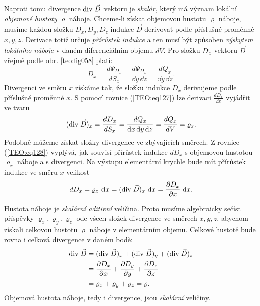       Naproti tomu divergence \(\mathrm{div}\;\vec{D}\) vektoru je \emph{skalár}, který má význam lokální 
      \emph{objemové hustoty} \(\varrho\) náboje. Chceme-li získat objemovou hustotu \(\varrho\) 
      náboje, musíme každou složku \(D_x, D_y , D_z\) indukce \(\vec{D}\) derivovat podle příslušné 
      proměnné \(x, y, z\). Derivace totiž určuje \emph{přírůstek indukce} a ten musí být způsoben 
      \emph{výskytem lokálního náboje} v daném diferenciálním objemu \(dV\). Pro složku \(D_x\) 
      vektoru \(\vec{D}\) zřejmě podle obr. \ref{teo:fig058} platí:
      \begin{equation}\label{TEO:eq127}
        D_x = \frac{d\Psi_{D_x}}{dS_x} =\frac{d\Psi_{D_x}}{\dd{y}\,\dd{z}} 
            = \frac{dQ_x}{\dd{y}\,\dd{z}}. 
      \end{equation} 
      Divergenci ve směru \(x\) získáme tak, že složku indukce \(D_x\) derivujeme podle příslušné 
      proměnné \(x\). S pomocí rovnice (\ref{TEO:eq127}) lze derivaci \(\frac{dD_x}{\dd{x}}\) 
      vyjádřit ve tvaru
      \begin{equation}\label{TEO:eq128}
        (\mathrm{div}\;\vec{D})_x = \frac{dD_x}{dS_x} = \frac{dQ_x}{\mathop{}\!\mathrm{d}x\mathop{}\!\mathrm{d}y\mathop{}\!\mathrm{d}z} 
                      = \frac{dQ_x}{dV}   = \varrho_x. 
      \end{equation} 
      Podobně můžeme získat složky divergence ve zbývajících směrech. Z rovnice 
      (\ref{TEO:eq128}) vyplývá, jak souvisí přírůstek indukce \(dD_x\) s objemovou hustotou 
      \(\varrho_x\) náboje a s divergenci. Na výstupu elementární krychle bude mít přírůstek 
      indukce ve směru \(x\) velikost
      \begin{equation*}
        dD_x = \varrho_x\,\mathop{}\!\mathrm{d}x = (\mathrm{div}\;\vec{D})_x\,\mathop{}\!\mathrm{d}x = \dfrac{\partial D_x}{\partial x}\,\mathop{}\!\mathrm{d}x. 
      \end{equation*} 

   
      Hustota náboje je \emph{skalární aditivní} veličina. Proto musíme algebraicky sečíst příspěvky
      \(\varrho_x, \varrho_y, \varrho_z\) ode všech složek divergence ve směrech \(x, y, z\),
      abychom získali celkovou hustotu \(\varrho\) náboje v elementárním objemu. Celkové hustotě
      bude rovna i celková divergence v daném bodě:
      \begin{align}\label{TEO:eq093}
        \mathrm{div}\;\vec{D} &= (\mathrm{div}\;\vec{D})_x + (\mathrm{div}\;\vec{D})_y + (\mathrm{div}\;\vec{D})_z  \nonumber \\
                  &= \dfrac{\partial D_x}{\partial x} + \dfrac{\partial D_y}{\partial y} + \dfrac{\partial D_z}{\partial z}  \nonumber \\
                  &= \varrho_x + \varrho_y + \varrho_z = \varrho. 
      \end{align} 
      Objemová hustota náboje, tedy i divergence, jsou \emph{skalární} veličiny.
      
